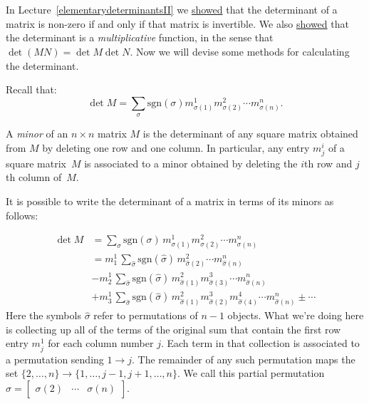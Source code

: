 
\chapter{\propDetTitle}

In Lecture~\ref{elementarydeterminantsII} we \hyperref[detinvertible]{showed} that the determinant of a matrix is non-zero if and only if that matrix is invertible.  We also \hyperref[detmultiplicative]{showed} that the determinant is a \emph{multiplicative} function, in the sense that $\det (MN)=\det M \det N$.  Now we will devise some methods for calculating the determinant.

Recall that:
\[
\det M = \sum_{\sigma} \text{sgn}(\sigma) m^1_{\sigma(1)}m^2_{\sigma(2)}\cdots m^n_{\sigma(n)}.
\]

A \emph{minor} of an $n\times n$ matrix $M$ is the determinant of any square matrix obtained from $M$ by deleting one row and one column.  In particular, any entry $m^i_j$ of a square matrix~$M$ is associated to a minor obtained by deleting the $i$th row and $j$th column of~$M$.

It is possible to write the determinant of a matrix in terms of  its minors as follows:

\begin{align*}
\det M &= \sum_{\sigma} \text{sgn}(\sigma)\, m^1_{\sigma(1)}m^2_{\sigma(2)}\cdots m^n_{\sigma(n)} \\
&= m^1_1\, \sum_{\hat{\sigma}} \text{sgn}(\hat{\sigma})\, m^2_{\hat{\sigma}(2)}\cdots m^n_{\hat{\sigma}(n)} \\
& -  m^1_2\, \sum_{\hat{\sigma}} \text{sgn}(\hat{\sigma})\, m^2_{\hat{\sigma}(1)}m^3_{\hat{\sigma}(3)}\cdots m^n_{\hat{\sigma}(n)} \\
& +  m^1_3\,  \sum_{\hat{\sigma}} \text{sgn}(\hat{\sigma})\, m^2_{\hat{\sigma}(1)}m^3_{\hat{\sigma}(2)}m^4_{\hat{\sigma}(4)}\cdots m^n_{\hat{\sigma}(n)} \pm \cdots
\end{align*}
Here the symbols $\hat{\sigma}$ refer to permutations of $n-1$ objects.  What we're doing here is collecting up all of the terms of the original sum that contain the first row entry $m^1_j$ for each column number $j$.  Each term in that collection is associated to a permutation sending $1\rightarrow j$.  The remainder of any such permutation maps the set $\{2, \ldots, n \}\rightarrow \{1, \ldots, j-1, j+1, \ldots, n \}$.  We call this partial permutation $\hat{\sigma}=\begin{bmatrix} \sigma(2) & \cdots & \sigma(n) \end{bmatrix}$.

